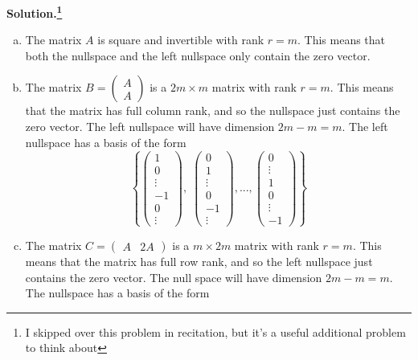 \documentclass[11pt]{article}
\begin{document}
\noindent \textbf{Solution.\footnote{I skipped over this problem in recitation, but it's a useful additional problem to think about}}\\
\begin{enumerate}[(a)]
\item The matrix $A$ is square and invertible with rank $r=m$. This means that both the nullspace and the left nullspace only contain the zero vector.
\item The matrix $B = \begin{pmatrix} A \\ A \end{pmatrix}$ is a $2m\times m$ matrix with rank $r=m$. This means that the matrix has full column rank, and so the nullspace just contains the zero vector. The left nullspace will have dimension $2m-m =m$. The left nullspace has a basis of the form
$$\left\{\begin{pmatrix} 1 \\ 0 \\ \vdots \\ -1 \\0\\ \vdots \end{pmatrix}, \; \begin{pmatrix} 0 \\ 1 \\  \vdots \\ 0 \\ -1\\ \vdots \end{pmatrix}, ... , \begin{pmatrix} 0 \\ \vdots \\ 1 \\ 0 \\ \vdots \\ -1 \end{pmatrix}\right\}$$
\item The matrix $C =\begin{pmatrix} A & 2A \end{pmatrix}$ is a $m\times 2m$ matrix with rank $r=m$. This means that the matrix has full row rank, and so the left nullspace just contains the zero vector. The null space will have dimension $2m-m=m$. The nullspace has a basis of the form 

\end{enumerate}
\end{document}

